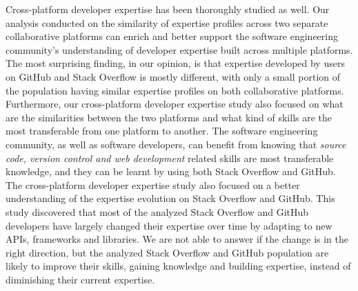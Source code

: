         Cross-platform developer expertise has been thoroughly studied as well. Our analysis conducted on the similarity of expertise profiles across two separate collaborative platforms can enrich and better support the software engineering community's understanding of developer expertise built across multiple platforms. The most surprising finding, in our opinion, is that expertise developed by users on GitHub and Stack Overflow is mostly different, with only a small portion of the population having similar expertise profiles on both collaborative platforms. Furthermore, our cross-platform developer expertise study also focused on what are the similarities between the two platforms and what kind of skills are the most transferable from one platform to another. The software engineering community, as well as software developers, can benefit from knowing that \emph{source code, version control and web development} related skills are most transferable knowledge, and they can be learnt by using both Stack Overflow and GitHub. The cross-platform developer expertise study also focused on a better understanding of the expertise evolution on Stack Overflow and GitHub. This study discovered that most of the analyzed Stack Overflow and GitHub developers have largely changed their expertise over time by adapting to new APIs, frameworks and libraries. We are not able to answer if the change is in the right direction, but the analyzed Stack Overflow and GitHub population are likely to improve their skills, gaining knowledge and building expertise, instead of diminishing their current expertise.
        
